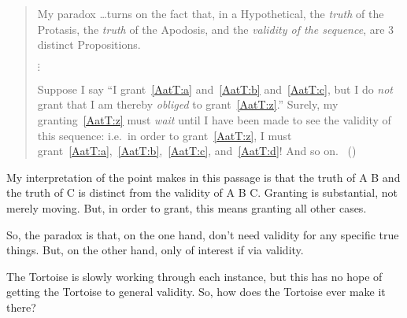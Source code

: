 \begin{note}
  \begin{quote}
    My paradox \dots turns on the fact that, in a Hypothetical, the \emph{truth} of the Protasis, the \emph{truth} of the Apodosis, and the \emph{validity of the sequence}, are 3 distinct Propositions.

    \mbox{}\hfill\(\vdots\)\hfill\mbox{}

    Suppose I say ``I grant~\ref{AatT:a} and~\ref{AatT:b} and~\ref{AatT:c}, but I do \emph{not} grant that I am thereby \emph{obliged} to grant~\ref{AatT:z}.''
    Surely, my granting~\ref{AatT:z} must \emph{wait} until I have been made to see the validity of this sequence: i.e.\ in order to grant~\ref{AatT:z}, I must grant~\ref{AatT:a},~\ref{AatT:b},~\ref{AatT:c}, and~\ref{AatT:d}! And so on.%
    \mbox{ }\hfill\mbox{(\citeyear[472]{Carroll:1977wl})}
  \end{quote}

  My interpretation of the point \citeauthor{Carroll:1895uj} makes in this passage is that the truth of A B and the truth of C is distinct from the validity of A B C.
  Granting is substantial, not merely moving.
  But, in order to grant, this means granting all other cases.

  So, the paradox is that, on the one hand, don't need validity for any specific true things.
  But, on the other hand, only of interest if via validity.

  The Tortoise is slowly working through each instance, but this has no hope of getting the Tortoise to general validity.
  So, how does the Tortoise ever make it there?
\end{note}

